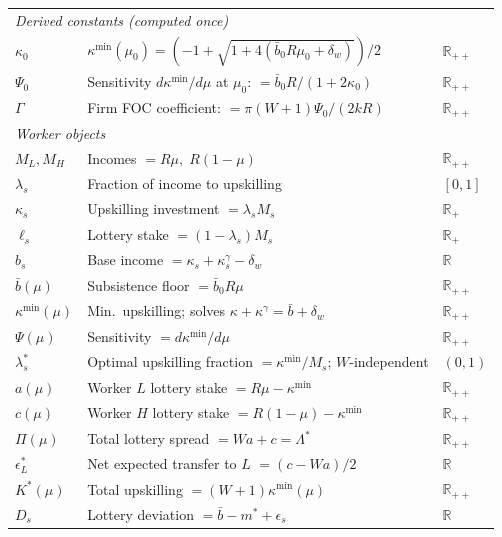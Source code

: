 \documentclass[12pt,a4paper]{article}
\begin{document}
\begin{table}[h!]
\begin{tabular}{lp{8.2cm}l}
\midrule
\multicolumn{3}{l}{\textit{Derived constants (computed once)}} \\
$\kappa_0$ & $\kappa^{\min}(\mu_0) = (-1+\sqrt{1+4(\bar{b}_0 R\mu_0+\delta_w)})/2$ & $\mathbb{R}_{++}$ \\
$\Psi_0$   & Sensitivity $d\kappa^{\min}/d\mu$ at $\mu_0$: $= \bar{b}_0 R/(1+2\kappa_0)$ & $\mathbb{R}_{++}$ \\
$\Gamma$   & Firm FOC coefficient: $= \pi(W+1)\Psi_0/(2kR)$      & $\mathbb{R}_{++}$ \\
\midrule
\multicolumn{3}{l}{\textit{Worker objects}} \\
$M_L, M_H$         & Incomes $= R\mu,\; R(1-\mu)$                    & $\mathbb{R}_{++}$ \\
$\lambda_s$        & Fraction of income to upskilling                & $[0,1]$ \\
$\kappa_s$         & Upskilling investment $= \lambda_s M_s$         & $\mathbb{R}_{+}$ \\
$\ell_s$           & Lottery stake $= (1-\lambda_s)M_s$              & $\mathbb{R}_{+}$ \\
$b_s$              & Base income $= \kappa_s+\kappa_s^\gamma-\delta_w$ & $\mathbb{R}$ \\
$\bar{b}(\mu)$     & Subsistence floor $= \bar{b}_0 R\mu$            & $\mathbb{R}_{++}$ \\
$\kappa^{\min}(\mu)$ & Min.\ upskilling; solves $\kappa+\kappa^\gamma = \bar{b}+\delta_w$ & $\mathbb{R}_{++}$ \\
$\Psi(\mu)$        & Sensitivity $= d\kappa^{\min}/d\mu$             & $\mathbb{R}_{++}$ \\
$\lambda_s^*$      & Optimal upskilling fraction $= \kappa^{\min}/M_s$; $W$-independent & $(0,1)$ \\
$a(\mu)$           & Worker $L$ lottery stake $= R\mu-\kappa^{\min}$ & $\mathbb{R}_{++}$ \\
$c(\mu)$           & Worker $H$ lottery stake $= R(1-\mu)-\kappa^{\min}$ & $\mathbb{R}_{++}$ \\
$\Pi(\mu)$         & Total lottery spread $= Wa+c = \Lambda^*$       & $\mathbb{R}_{++}$ \\
$\epsilon_L^*$     & Net expected transfer to $L$ $= (c-Wa)/2$       & $\mathbb{R}$ \\
$K^*(\mu)$         & Total upskilling $= (W+1)\kappa^{\min}(\mu)$    & $\mathbb{R}_{++}$ \\
$D_s$              & Lottery deviation $= \bar{b}-m^*+\epsilon_s$    & $\mathbb{R}$ \\

\end{tabular}
\end{table}
\end{document}
